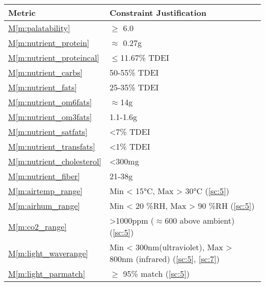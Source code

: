 \documentclass{report}
\newcommand{\mref}[1]{\hyperref[#1]{M\ref{#1}}}
\begin{document}
\begin{tabular}{|l|p{14.35cm}|}
    \hline
    \textbf{Metric} & \textbf{Constraint \hfill Justification} \\
    \hline
    \mref{m:palatability} & $\ge$ 6.0 \hfill \cite{applicantguide,dsfc-phase2}\\
    \hline
    \mref{m:nutrient_protein} & $\approx$ 0.27g \hfill \cite{applicantguide,dsfc-phase2,nutrition}\\
    \hline
    \mref{m:nutrient_proteincal} & $\le$11.67\% TDEI \hfill \cite{applicantguide,dsfc-phase2,nutrition}\\
    \hline
    \mref{m:nutrient_carbs} & 50-55\% TDEI \hfill \cite{applicantguide,dsfc-phase2,nutrition}\\
    \hline
    \mref{m:nutrient_fats} & 25-35\% TDEI \hfill \cite{applicantguide,dsfc-phase2,nutrition}\\
    \hline
    \mref{m:nutrient_om6fats} & $\approx$14g \hfill \cite{applicantguide,dsfc-phase2,nutrition}\\
    \hline
    \mref{m:nutrient_om3fats} & 1.1-1.6g \hfill \cite{applicantguide,dsfc-phase2,nutrition}\\
    \hline
    \mref{m:nutrient_satfats} & <7\% TDEI \hfill \cite{applicantguide,dsfc-phase2,nutrition}\\
    \hline
    \mref{m:nutrient_transfats} & <1\% TDEI \hfill \cite{applicantguide,dsfc-phase2,nutrition}\\
    \hline
    \mref{m:nutrient_cholesterol} & <300mg \hfill \cite{applicantguide,dsfc-phase2,nutrition}\\
    \hline
    \mref{m:nutrient_fiber} & 21-38g \hfill \cite{applicantguide,dsfc-phase2,nutrition}\\
    \hline
    \mref{m:airtemp_range} & Min < 15°C, Max > 30°C \hfill (\ref{sc:5})\\
    \hline
    \mref{m:airhum_range} & Min < 20 \%RH, Max > 90 \%RH \hfill (\ref{sc:5}) \\
    \hline
    \mref{m:co2_range} & >1000ppm ($\approx$600 above ambient) \hfill (\ref{sc:5}) \\
    \hline
    \mref{m:light_waverange} & Min < 300nm\footnotemark[6] (ultraviolet), Max > 800nm (infrared) \hfill (\ref{sc:5}, \ref{sc:7}) \cite{uvc-disinfection} \\
    \hline
    \mref{m:light_parmatch} & $\ge$ 95\% match \hfill (\ref{sc:5}) \\

\end{tabular}
\end{document}
